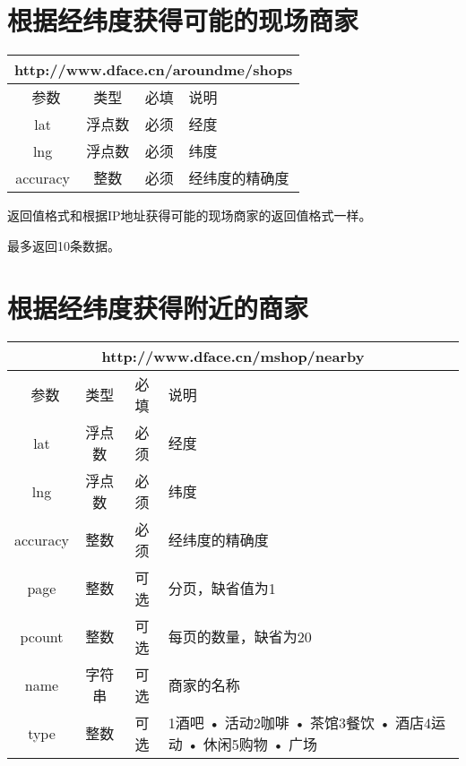 \documentclass[cs4size]{ctexartutf8}
\begin{document}
\section{根据经纬度获得可能的现场商家}

\begin{table}[H]
   \begin{center}
\begin{tabular}{|c|c|c|p{12cm}|}
\hline
\multicolumn{4}{|c|}{http://www.dface.cn/aroundme/shops} \\
\hline\hline
 \  参数  & 类型 & 必填 &  说明  \\
\hline
 lat  & 浮点数 & 必须 & 经度\\
\hline
 lng  &  浮点数 & 必须 & 纬度\\ 
\hline
 accuracy  & 整数 & 必须 & 经纬度的精确度\\ 
\hline
\end{tabular}
   \end{center}
\end{table}

返回值格式和根据IP地址获得可能的现场商家的返回值格式一样。

最多返回10条数据。



\section{根据经纬度获得附近的商家}

\begin{table}[H]
   \begin{center}
\begin{tabular}{|c|c|c|p{12cm}|}
\hline
\multicolumn{4}{|c|}{http://www.dface.cn/mshop/nearby} \\
\hline\hline
 \  参数  & 类型 & 必填 &  说明  \\
\hline
 lat  & 浮点数 & 必须 & 经度\\
\hline
 lng  &  浮点数 & 必须 & 纬度\\ 
\hline
 accuracy  & 整数 & 必须 & 经纬度的精确度\\ 
 \hline
 page  & 整数 & 可选 & 分页，缺省值为1\\ 
 \hline
 pcount  & 整数 & 可选 & 每页的数量，缺省为20\\ 
  \hline
 name  & 字符串 & 可选 & 商家的名称\\ 
  \hline
 type  & 整数 & 可选 & 1酒吧 • 活动2咖啡 • 茶馆3餐饮 • 酒店4运动 • 休闲5购物 • 广场\\  
\hline
\end{tabular}
   \end{center}
\end{table}
\end{document}
